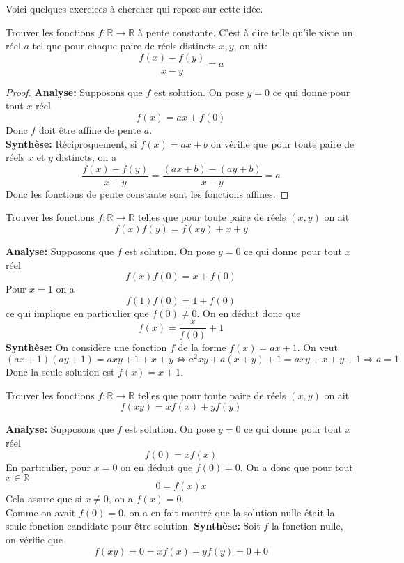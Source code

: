 Voici quelques exercices à chercher qui repose sur cette idée.
\begin{exo}[F]
Trouver les fonctions $f:\mathbb{R}\to \mathbb{R}$ à pente constante. C'est à dire telle qu'ile xiste un réel $a$ tel que pour chaque paire de réels distincts $x,y$, on ait:
$$\frac{f(x)-f(y)}{x-y}=a $$
\end{exo}

\begin{proof}
\textbf{Analyse:} Supposons que $f$ est solution. On pose $y=0$ ce qui donne pour tout $x$ réel
$$f(x)=ax+f(0) $$
Donc $f$ doit être affine de pente $a$.
\\
\textbf{Synthèse:} Réciproquement, si $f(x)=ax+b$ on vérifie que pour toute paire de réels $x$ et $y$ distincts, on a
$$\frac{f(x)-f(y)}{x-y}=\frac{(ax+b)-(ay+b)}{x-y}=a $$
Donc les fonctions de pente constante sont les fonctions affines.
\end{proof}
\begin{exo}[F]
Trouver les fonctions $f:\mathbb{R}\to \mathbb{R}$ telles que pour toute paire de réels $(x,y)$ on ait
$$f(x)f(y)=f(xy)+x+y $$
\end{exo}
\begin{preuve}
\textbf{Analyse:} Supposons que $f$ est solution. On pose $y=0$ ce qui donne pour tout $x$ réel
$$f(x)f(0)=x+f(0) $$
Pour $x=1$ on a
$$f(1)f(0)=1+f(0) $$ ce qui implique en particulier que $f(0)\neq 0$. On en déduit donc que 
$$f(x)=\frac{x}{f(0)}+1 $$
\textbf{Synthèse:} On considère une fonction $f$ de la forme $f(x)=ax+1$. On veut
$$(ax+1)(ay+1)=axy+1+x+y\iff a^2xy+a(x+y)+1=axy+x+y+1\Rightarrow a=1 $$
Donc la seule solution est $f(x)=x+1$.
\end{preuve}
\begin{exo}[F]
Trouver les fonctions $f:\mathbb{R}\to \mathbb{R}$ telles que pour toute paire de réels $(x,y)$ on ait
$$f(xy)=xf(x)+yf(y) $$

\end{exo}
\begin{preuve}
\textbf{Analyse:} Supposons que $f$ est solution. On pose $y=0$ ce qui donne pour tout $x$ réel
$$f(0)=xf(x) $$
En particulier, pour $x=0$ on en déduit que $f(0)=0$. On a donc que pour tout $x\in \mathbb{R}$
$$0=f(x)x $$ Cela assure que si $x\neq 0$, on a $f(x)=0$.
\\
Comme on avait $f(0)=0$, on a en fait montré que la solution nulle était la seule fonction candidate pour être solution.
\textbf{Synthèse:} Soit $f$ la fonction nulle, on  vérifie que 
$$f(xy)=0=xf(x)+yf(y)=0+0 $$
\end{preuve}
